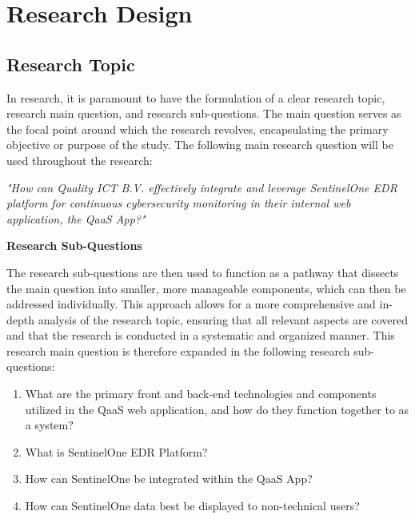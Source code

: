 \chapter{Research Design}

\section{Research Topic}
In research, it is paramount to have the formulation of a clear research topic, research main question,
and research sub-questions. The main question serves as the focal point around which the research revolves,
encapsulating the primary objective or purpose of the study.
The following main research question will be used throughout the research:


\begin{center}
      \textit{"How can Quality ICT B.V. effectively integrate and leverage SentinelOne EDR platform
            for continuous cybersecurity monitoring in their internal web application, the QaaS App?"}
\end{center}

\textbf{Research Sub-Questions}

The research sub-questions are then used to function as a pathway that dissects the main
question into smaller, more manageable components, which can then be addressed individually. This approach
allows for a more comprehensive and in-depth analysis of the research topic, ensuring that all relevant
aspects are covered and that the research is conducted in a systematic and organized manner.
This research main question is therefore expanded in the following research sub-questions:


\begin{enumerate}
      \item What are the primary front and back-end technologies and components utilized in the QaaS web application, and how do they
            function together to as a system?
      \item What is SentinelOne EDR Platform?
      \item How can SentinelOne be integrated within the QaaS App?
      \item How can SentinelOne data best be displayed to non-technical users?
\end{enumerate}

